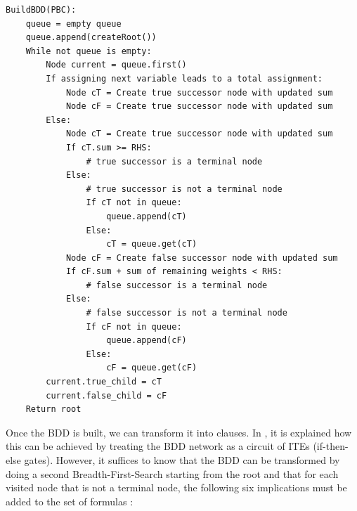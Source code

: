 {
\pseudo{}
\renewcommand{\lstlistingname}{Algorithm}
\begin{lstlisting}[frame=single,caption={Pseudo Code of BDD construction},captionpos=b, label=CodeBDDConstruction, basicstyle=\footnotesize]
BuildBDD(PBC):
    queue = empty queue
    queue.append(createRoot())
    While not queue is empty:
        Node current = queue.first()
        If assigning next variable leads to a total assignment:
            Node cT = Create true successor node with updated sum
            Node cF = Create true successor node with updated sum
        Else:
            Node cT = Create true successor node with updated sum
            If cT.sum >= RHS:
                # true successor is a terminal node
            Else:
                # true successor is not a terminal node
                If cT not in queue:
                    queue.append(cT)
                Else:
                    cT = queue.get(cT)
            Node cF = Create false successor node with updated sum
            If cF.sum + sum of remaining weights < RHS:
                # false successor is a terminal node
            Else:
                # false successor is not a terminal node
                If cF not in queue:
                    queue.append(cF)
                Else:
                    cF = queue.get(cF)
        current.true_child = cT
        current.false_child = cF
    Return root
\end{lstlisting}
}

Once the BDD is built, we can transform it into clauses. In \cite{Een2006TranslatingPC}, it is explained how this can be achieved by treating the BDD network as a circuit of ITEs (if-then-else gates). However, it suffices to know that the BDD can be transformed by doing a second Breadth-First-Search starting from the root and that for each visited node that is not a terminal node, the following six implications must be added to the set of formulas \cite{Een2006TranslatingPC}:

